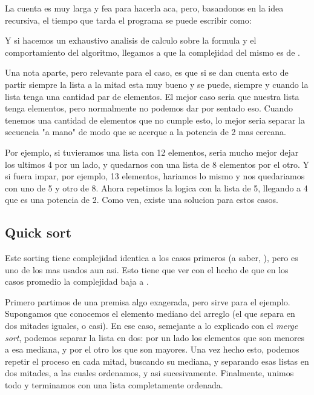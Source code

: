 \documentclass{article}
\begin{document}
La cuenta es muy larga y fea para hacerla aca, pero, basandonos en la idea recursiva, el tiempo que tarda el programa se puede escribir como:


Y si hacemos un exhaustivo analisis de calculo sobre la formula y el comportamiento del algoritmo, llegamos a que la complejidad del mismo es de .

Una nota aparte, pero relevante para el caso, es que si se dan cuenta esto de partir siempre la lista a la mitad esta muy bueno y se puede, siempre y cuando la lista tenga una cantidad par de elementos. El mejor caso seria que nuestra lista tenga  elementos, pero normalmente no podemos dar por sentado eso. Cuando tenemos una cantidad de elementos que no cumple esto, lo mejor seria separar la secuencia "a mano" de modo que se acerque a la potencia de 2 mas cercana.

Por ejemplo, si tuvieramos una lista con 12 elementos, seria mucho mejor dejar los ultimos 4 por un lado, y quedarnos con una lista de 8 elementos por el otro. Y si fuera impar, por ejemplo, 13 elementos, hariamos lo mismo y nos quedariamos con uno de 5 y otro de 8. Ahora repetimos la logica con la lista de 5, llegando a 4 que es una potencia de 2. Como ven, existe una solucion para estos casos.

\subsection{Quick sort}
Este sorting tiene complejidad identica a los casos primeros (a saber, ), pero es uno de los mas usados aun asi. Esto tiene que ver con el hecho de que en los casos promedio la complejidad baja a .

Primero partimos de una premisa algo exagerada, pero sirve para el ejemplo. Supongamos que conocemos el elemento mediano del arreglo (el que separa en dos mitades iguales, o casi). En ese caso, semejante a lo explicado con el \textit{merge sort}, podemos separar la lista en dos: por un lado los elementos que son menores a esa mediana, y por el otro los que son mayores. Una vez hecho esto, podemos repetir el proceso en cada mitad, buscando su mediana, y separando esas listas en dos mitades, a las cuales ordenamos, y asi sucesivamente. Finalmente, unimos todo y terminamos con una lista completamente ordenada.
\end{document}
